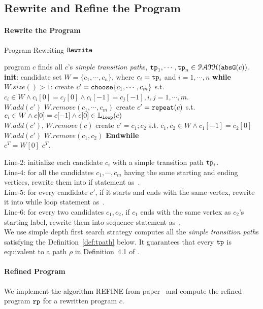 \subsection{Rewrite and Refine the Program}
\paragraph{Rewrite the Program}
\begin{algorithm}
  \caption{Program Rewriting $\mathtt{Rewrite}$}
  \label{alg:alg-refine_rewrite}
  \begin{algorithmic}[1]
    \REQUIRE program $c$
    \STATE finds all $c$'s \emph{simple transition path}s, $\mathtt{tp}_1, \cdots, \mathtt{tp}_n \in \mathcal{PATH}(\mathtt{abs}{\mathtt{G}}(c))$.
    \STATE \textbf{init}: candidate set $W = \{c_1, \cdots, c_n\}$, where $c_i = \mathtt{tp}_i$ and $i = 1, \cdots, n$
    \STATE \textbf{while} $W.size()> 1$:
    \STATE \quad create $c' = \rpchoose{c_1, \cdots, c_m}$ 
    s.t. $c_i \in W \land c_i[0] = c_j[0] \land c_i[-1] = c_j[-1], i, j = 1, \cdots, m$.
    \\ \quad $W.add(c')$ \qquad $W.remove(c_1, \cdots, c_m)$
    \STATE
    \quad create $c' = \mathtt{repeat}(c)$ s.t. $c_i \in W \land c[0] = c[-1] \land c[0] \in \mathbb{L}_{\mathtt{loop}}(c)$
    \\ \quad $W.add(c')$, \qquad $W.remove(c)$
    \STATE \quad create $c' = c_1; c_2$ s.t. $c_1, c_2 \in W \land c_1[-1] = c_2[0]$
    \\
    \quad $W.add(c')$ \qquad $W.remove(c_1, c_2)$
    \STATE \textbf{Endwhile}
    \\ $c^T = W[0]$
    \RETURN $c^T$.
\end{algorithmic}
\end{algorithm}
%
Line-2: initialize each candidate $c_i$ with a simple transition path $\mathtt{tp}_i$.
\\
Line-4: for all the candidates $c_1, \cdots, c_m$ having the same starting and ending vertices, rewrite them into if statement as~\cite{GulwaniJK09}.
\\
Line-5: for every candidate $c'$, if it starts and ends with the same vertex, rewrite it into while loop statement as~\cite{GulwaniJK09}.
\\
Line-6: for every two candidates $c_1, c_2$, if $c_1$ ends with the same vertex as $c_2$'s starting label, rewrite them into sequence statement as~\cite{GulwaniJK09}.
\\
We use simple depth first search strategy computes all the \emph{simple transition path}s satisfying the Definition~\ref{def:tpath} below.
It guarantees that  every $\mathtt{tp}$ is equivalent to a path $\rho$ in Definition~4.1 of \cite{GulwaniJK09}.

\paragraph{Refined Program}
We implement the algorithm REFINE from paper~\cite{GulwaniJK09} and compute the 
refined program $\mathtt{rp}$ for a rewritten program $c$.
